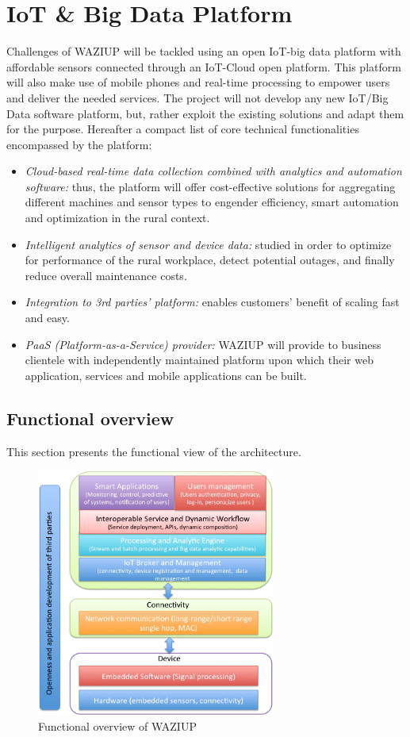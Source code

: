 
\section{IoT \& Big Data Platform}

Challenges of WAZIUP will be tackled using an open IoT-big data platform with affordable sensors connected through an IoT-Cloud open platform.
This platform will also make use of mobile phones and real-time processing to empower users and deliver the needed services.
The project will not develop any new IoT/Big Data software platform, but, rather exploit the existing solutions and adapt them for the purpose. Hereafter a compact list of core technical functionalities encompassed by the platform:

\begin{itemize}
   \item \emph{Cloud-based real-time data collection combined with analytics and automation software:} thus, the platform will offer cost-effective solutions for aggregating different machines and sensor types to engender efficiency, smart automation and optimization in the rural context.
   \item \emph{Intelligent analytics of sensor and device data:} studied in order to optimize for performance of the rural workplace, detect potential outages, and finally reduce overall maintenance costs.
   \item \emph{Integration to 3rd parties' platform:} enables customers' benefit of scaling fast and easy.
   \item \emph{PaaS (Platform-as-a-Service) provider:} WAZIUP will provide to business clientele with independently maintained platform upon which their web application, services and mobile applications can be built.
\end{itemize}

\subsection{Functional overview}
This section presents the functional view of the architecture. 

\begin{figure}[h!]
\centering
\includegraphics[width=0.7\textwidth]{figs/functional.png}
\caption{Functional overview of WAZIUP}
\label{fig:func}
\end{figure}

